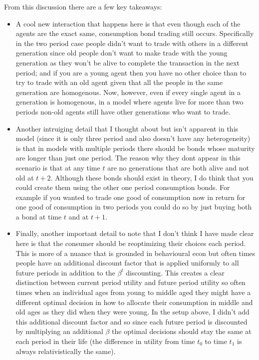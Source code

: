 \documentclass[11pt,english]{article}
\begin{document}
From this discussion there are a few key takeaways:
\begin{itemize}
	\item A cool new interaction that happens here is that even though each of the agents are the exact same, consumption bond trading still occurs. Specifically in the two period case people didn't want to trade with others in a different generation since old people don't want to make trade with the young generation as they won't be alive to complete the transaction in the next period; and if you are a young agent then you have no other choice than to try to trade with an old agent given that all the people in the same generation are homogenous. Now, however, even if every single agent in a generation is homogenous, in a model where agents live for more than two periods non-old agents still have other generations who want to trade. 

	\item Another intruiging detail that I thought about but isn't apparent in this model (since it is only three period and also doesn't have any heterogeneity) is that in models with multiple periods there should be bonds whose maturity are longer than just one period. The reason why they dont appear in this scenario is that at any time $t$ are no generations that are both alive and not old at $t+2$. Although these bonds should exist in theory, I do think that you could create them using the other one period consumption bonds. For example if you wanted to trade one good of consumption now in return for one good of consumption in two periods you could do so by just buying both a bond at time $t$ and at $t+1$.

	\item Finally, another important detail to note that I don't think I have made clear here is that the consumer should be reoptimizing their choices each period. This is more of a nuance that is grounded in behavioural econ but often times people have an additional discount factor that is applied uniformly to all future periods in addition to the $\beta^t$ discounting. This creates a clear distinction between current period utility and future period utility so often times when an individual ages from young to middle aged they might have a different optimal decision in how to allocate their consumption in middle and old ages as they did when they were young. In the setup above, I didn't add this additional discount factor and so since each future period is discounted by multiplying an additional $\beta$ the optimal decisions should stay the same at each period in their life (the difference in utility from time $t_0$ to time $t_1$ is always relativistically the same).
\end{itemize}
\end{document}
